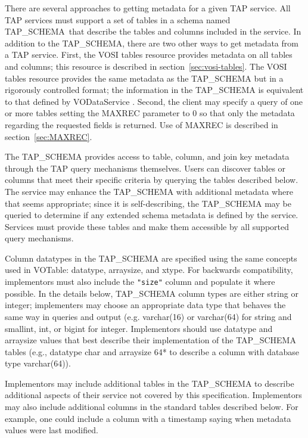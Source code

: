 \documentclass[11pt,letter]{ivoa}
\newcommand{\tapschema}{TAP\_SCHE\-MA}
\newcommand{\tapschema}{\mbox{%
  \relsize{-0.5}TAP\discretionary{-}{}{\kern-2pt\_}SCHEMA}}
\begin{document}
There are several approaches to getting metadata for a given TAP service. All 
TAP services must support a set of tables in a schema named 
\tapschema\ that describe the tables and columns included in the 
service. In addition to the \tapschema, there are two other ways 
to get metadata from a TAP service. First, the VOSI tables resource provides 
metadata on all tables and columns; this resource is described in 
section~\ref{sec:vosi-tables}. The 
VOSI tables resource provides the same metadata as the \tapschema{}
but in a rigorously controlled format; the information in the 
\tapschema{} is equivalent to that defined by VODataService 
\citep{2010ivoa.spec.1202P}. Second, the client may specify a query of one or more 
tables setting the 
MAXREC parameter to 0 so that only the metadata regarding the requested fields 
is returned. Use of MAXREC is described in section~\ref{sec:MAXREC}.

The \tapschema{} provides access to table, column, and join key 
metadata through the TAP query mechanisms themselves. Users can discover tables 
or columns that meet their specific criteria by querying the tables described 
below.  The service may enhance the \tapschema{} with additional 
metadata where that seems appropriate; since it is self-describing, the 
\tapschema{} may be queried to determine if any extended schema 
metadata is defined by the service. Services must provide these tables and make 
them accessible by all supported query mechanisms.

Column datatypes in the \tapschema{} are specified using the same concepts used in 
VOTable: datatype, arraysize, and xtype. For backwards compatibility, implementors
must also include the \verb|"size"| column and populate it where possible. In the details
below, \tapschema{} column types are either string or integer; implementers may choose an 
appropriate data type that behaves the same way in queries and output (e.g. varchar(16) or
varchar(64) for string and smallint, int, or bigint for integer.
Implementors should use datatype and arraysize values
that best describe their implementation of the \tapschema{} tables (e.g., datatype char 
and arraysize 64* to describe a column with database type varchar(64)).

Implementors may include additional tables in the 
\tapschema{} to describe additional aspects of their service not 
covered by this specification. Implementors may also include additional columns 
in the standard tables described below. For example, one could include a column 
with a timestamp saying when metadata values were last modified.
\end{document}
